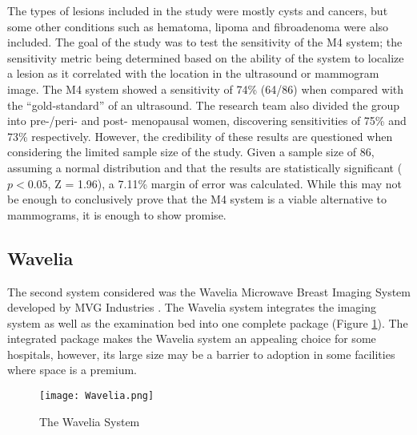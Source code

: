 The types of lesions included in the study were mostly cysts and cancers, but some other conditions such as hematoma,
lipoma and fibroadenoma were also included. The goal of the study was to test the sensitivity of the M4 system; the
sensitivity metric being determined based on the ability of the system to localize a lesion as it correlated with the
location in the ultrasound or mammogram image. The M4 system showed a sensitivity of 74\% (64/86) when compared with the
``gold-standard'' of an ultrasound. The research team also divided the group into pre-/peri- and post- menopausal women,
discovering sensitivities of 75\% and 73\% respectively. However, the credibility of these results are questioned when
considering the limited sample size of the study. Given a sample size of 86, assuming a normal distribution and that the results
are statistically significant ($p < 0.05$, Z = 1.96), a 7.11\% margin of error was calculated. While this may not be
enough to conclusively prove that the M4 system is a viable alternative to mammograms, it is enough to show promise.

\subsection{Wavelia}
The second system considered was the Wavelia Microwave Breast Imaging System developed by MVG Industries
\cite{moloneyWaveliaMicrowaveBreast2021}. The Wavelia system integrates the imaging system as well as the examination
bed into one complete package (Figure \ref{fig:WaveliaSystem}). The integrated package makes the Wavelia system an
appealing choice for some hospitals, however, its large size may be a barrier to adoption in some facilities where space
is a premium.\hfill \break

\begin{figure}
    \texttt{[image: Wavelia.png]}
    \centering
    \caption{The Wavelia System \cite{moloneyWaveliaMicrowaveBreast2021}}
    \label{fig:WaveliaSystem}
\end{figure}

